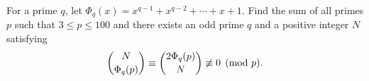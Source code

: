 For a prime $q$, let $\Phi_q(x)=x^{q-1}+x^{q-2}+\cdots+x+1$. 
Find the sum of all primes $p$ such that $3 \le p \le 100$ and there exists an odd prime $q$ and a positive integer $N$ satisfying
\[\dbinom{N}{\Phi_q(p)}\equiv \dbinom{2\Phi_q(p)}{N} \not \equiv 0 \pmod p. \]
